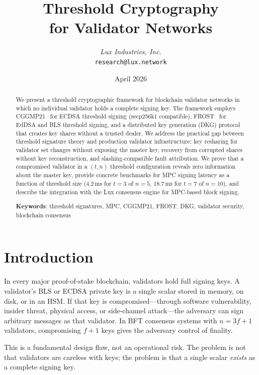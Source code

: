 \documentclass[11pt,a4paper]{article}
\title{\textbf{Threshold Cryptography\\for Validator Networks}}
\author{
\textit{Lux Industries, Inc.}\\
\texttt{research@lux.network}
}
\date{April 2026}
\begin{document}
\luxcoverpage

\begin{abstract}
We present a threshold cryptographic framework for blockchain validator networks in
which no individual validator holds a complete signing key. The framework employs
CGGMP21~\cite{canetti2021uc} for ECDSA threshold signing (secp256k1 compatible),
FROST~\cite{komlo2020frost} for EdDSA and BLS threshold signing, and a distributed
key generation (DKG) protocol that creates key shares without a trusted dealer. We
address the practical gap between threshold signature theory and production validator
infrastructure: key resharing for validator set changes without exposing the master
key, recovery from corrupted shares without key reconstruction, and slashing-compatible
fault attribution. We prove that a compromised validator in a $(t, n)$ threshold
configuration reveals zero information about the master key, provide concrete benchmarks
for MPC signing latency as a function of threshold size (4.2\,ms for $t=3$ of $n=5$,
18.7\,ms for $t=7$ of $n=10$), and describe the integration with the Lux consensus
engine for MPC-based block signing.

\textbf{Keywords}: threshold signatures, MPC, CGGMP21, FROST, DKG, validator security,
blockchain consensus
\end{abstract}

\tableofcontents
\newpage

\section{Introduction}
\label{sec:introduction}

In every major proof-of-stake blockchain, validators hold full signing keys. A
validator's BLS or ECDSA private key is a single scalar stored in memory, on disk,
or in an HSM. If that key is compromised---through software vulnerability, insider
threat, physical access, or side-channel attack---the adversary can sign arbitrary
messages as that validator. In BFT consensus systems with $n = 3f + 1$ validators,
compromising $f + 1$ keys gives the adversary control of finality.

This is a fundamental design flaw, not an operational risk. The problem is not that
validators are careless with keys; the problem is that a single scalar \emph{exists}
as a complete signing key.
\end{document}
